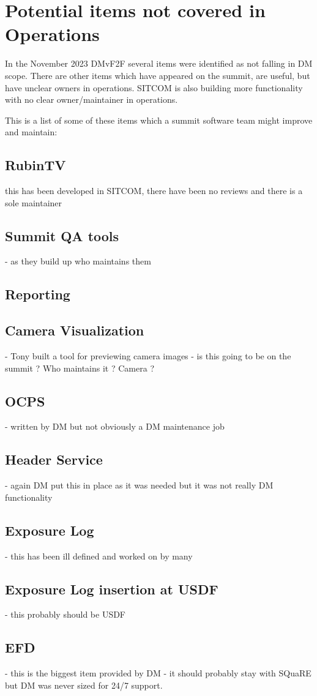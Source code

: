 \section{Potential items not covered in \gls{Operations}} \label{sec:items}

In the November 2023 DMvF2F several items were identified as not falling in \gls{DM} scope.
There are other items which have appeared on the summit, are useful, but have unclear owners in operations.
SITCOM is also building more functionality with no clear owner/maintainer in operations.

This is a list of some of these items which a summit \gls{software} team might improve and maintain:

\subsection{ RubinTV }
 this has been developed in \gls{SITCOM}, there have been no reviews and there is a sole maintainer

\subsection{ Summit \gls{QA} tools}
 - as they build up who maintains them

\subsection{ Reporting }

\subsection{ \gls{Camera} Visualization}
 - Tony built a tool for previewing camera images - is this going to be on the summit ? Who maintains it ? \gls{Camera} ?

\subsection{ \gls{OCPS} }
- written by \gls{DM} but not obviously a \gls{DM} maintenance job

\subsection{ Header Service }
- again \gls{DM} put this in place as it was  needed but it was not really \gls{DM} functionality

\subsection{ Exposure Log}
 - this has been ill defined and worked on by many

\subsection{ Exposure Log  insertion at \gls{USDF}}
 - this probably  should be \gls{USDF}

\subsection{ \gls{EFD}}
 - this is the biggest item provided by \gls{DM} - it should probably stay with SQuaRE but \gls{DM} was never sized for 24/7 support.

